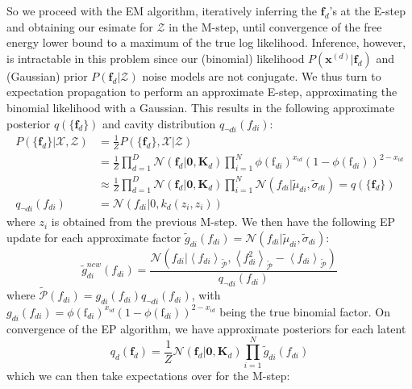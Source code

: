 \documentclass[a4paper]{article}
\begin{document}
So we proceed with the EM algorithm, iteratively inferring the $\mathbf{f}_d$'s at the E-step and obtaining our esimate for $\mathcal{Z}$ in the M-step, until convergence of the free energy lower bound to a maximum of the true log likelihood. Inference, however, is intractable in this problem since our (binomial) likelihood $P(\mathbf{x}^{(d)}|\mathbf{f}_d)$ and (Gaussian) prior $P(\mathbf{f}_d|\mathcal{Z})$ noise models are not conjugate. We thus turn to expectation propagation to perform an approximate E-step, approximating the binomial likelihood with a Gaussian. This results in the following approximate posterior $q(\{\mathbf{f}_d\})$ and cavity distribution $q_{\neg di}(f_{di})$:
\begin{align*}
P(\{\mathbf{f}_d\}|\mathcal{X,Z}) &= \frac{1}{Z}P(\{\mathbf{f}_d\},\mathcal{X}|\mathcal{Z}) \\
&= \frac{1}{Z} \prod_{d=1}^D \mathcal{N}(\mathbf{f}_d|\mathbf{0},\mathbf{K}_d) \prod_{i=1}^N \phi(\textrm{f}_{di})^{x_{id}}(1-\phi(\textrm{f}_{di}))^{2-x_{id}} \\
&\approx \frac{1}{Z} \prod_{d=1}^D \mathcal{N}(\mathbf{f}_d|\mathbf{0},\mathbf{K}_d) \prod_{i=1}^N \mathcal{N}(f_{di}|\tilde{\mu}_{di},\tilde{\sigma}_{di}) = q(\{\mathbf{f}_d\}) \\
q_{\neg di}(f_{di}) &= \mathcal{N}(f_{di}|0,k_d(z_i,z_i))
\end{align*}
 where $z_i$ is obtained from the previous M-step. We then have the following EP update for each approximate factor $\tilde{g}_{di}(f_{di}) = \mathcal{N}(f_{di}|\tilde{\mu}_{di},\tilde{\sigma}_{di})$:
\[ \tilde{g}_{di}^{new}(f_{di}) = \frac{\mathcal{N}\left( f_{di}|\left\langle f_{di} \right\rangle_{\tilde{\mathcal{P}}},\left\langle f_{di}^2 \right\rangle_{\tilde{\mathcal{P}}} - \left\langle f_{di} \right\rangle_{\tilde{\mathcal{P}}} \right)}{q_{\neg di}(f_{di})} \]
where $\tilde{\mathcal{P}}(f_{di}) = g_{di}(f_{di})q_{\neg di}(f_{di})$, with $g_{di}(f_{di}) = \phi(\textrm{f}_{di})^{x_{id}}(1-\phi(\textrm{f}_{di}))^{2-x_{id}}$ being the true binomial factor. On convergence of the EP algorithm, we have approximate posteriors for each latent
\[ q_d(\mathbf{f}_d) = \frac{1}{Z}\mathcal{N}(\mathbf{f}_d|\mathbf{0},\mathbf{K}_d) \prod_{i=1}^N \tilde{g}_{di}(f_{di}) \]
which we can then take expectations over for the M-step:
\end{document}
